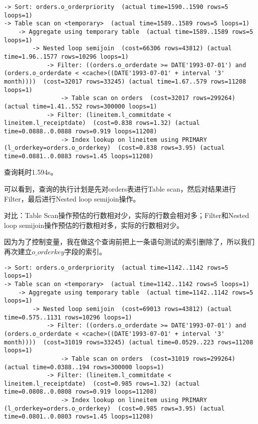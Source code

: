 \documentclass{article}
\begin{document}
\begin{lstlisting}
-> Sort: orders.o_orderpriority  (actual time=1590..1590 rows=5 loops=1)
-> Table scan on <temporary>  (actual time=1589..1589 rows=5 loops=1)
    -> Aggregate using temporary table  (actual time=1589..1589 rows=5 loops=1)
        -> Nested loop semijoin  (cost=66306 rows=43812) (actual time=1.96..1577 rows=10296 loops=1)
            -> Filter: ((orders.o_orderdate >= DATE'1993-07-01') and (orders.o_orderdate < <cache>((DATE'1993-07-01' + interval '3' month))))  (cost=32017 rows=33245) (actual time=1.67..579 rows=11208 loops=1)
                -> Table scan on orders  (cost=32017 rows=299264) (actual time=1.41..552 rows=300000 loops=1)
            -> Filter: (lineitem.l_commitdate < lineitem.l_receiptdate)  (cost=0.838 rows=1.32) (actual time=0.0888..0.0888 rows=0.919 loops=11208)
                -> Index lookup on lineitem using PRIMARY (l_orderkey=orders.o_orderkey)  (cost=0.838 rows=3.95) (actual time=0.0881..0.0883 rows=1.45 loops=11208)
\end{lstlisting}

查询耗时1.594s。

可以看到，查询的执行计划是先对orders表进行Table scan，然后对结果进行Filter，最后进行Nested loop semijoin操作。

对比：Table Scan操作预估的行数相对少，实际的行数会相对多；Filter和Nested loop semijoin操作预估的行数相对多，实际的行数相对少。

因为为了控制变量，我在做这个查询前把上一条语句测试的索引删除了，所以我们再次建立$o\_orderkey$字段的索引。

\begin{lstlisting}
-> Sort: orders.o_orderpriority  (actual time=1142..1142 rows=5 loops=1)
-> Table scan on <temporary>  (actual time=1142..1142 rows=5 loops=1)
    -> Aggregate using temporary table  (actual time=1142..1142 rows=5 loops=1)
        -> Nested loop semijoin  (cost=69013 rows=43812) (actual time=0.575..1131 rows=10296 loops=1)
            -> Filter: ((orders.o_orderdate >= DATE'1993-07-01') and (orders.o_orderdate < <cache>((DATE'1993-07-01' + interval '3' month))))  (cost=31019 rows=33245) (actual time=0.0529..223 rows=11208 loops=1)
                -> Table scan on orders  (cost=31019 rows=299264) (actual time=0.0388..194 rows=300000 loops=1)
            -> Filter: (lineitem.l_commitdate < lineitem.l_receiptdate)  (cost=0.985 rows=1.32) (actual time=0.0808..0.0808 rows=0.919 loops=11208)
                -> Index lookup on lineitem using PRIMARY (l_orderkey=orders.o_orderkey)  (cost=0.985 rows=3.95) (actual time=0.0801..0.0803 rows=1.45 loops=11208)
\end{lstlisting}
\end{document}
